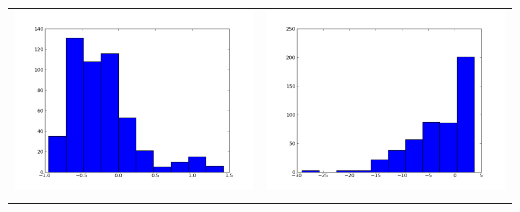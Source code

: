 \documentclass[12pt,a4paper,titlepage]{article}
\begin{document}
\begin{table}[ht]
\begin{tabular}{cc}
\includegraphics[scale=0.2]{p2th1_1}&\includegraphics[scale=0.2]{p2th2_1.png}\\
\newline

\end{tabular}
\end{table}
\end{document}
